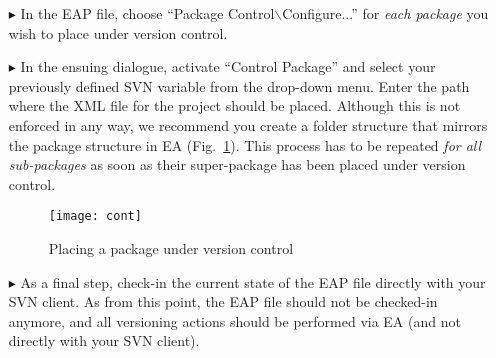 \begin{enumerate}
\item[$\blacktriangleright$] In the EAP file, choose ``Package Control$\backslash$Configure...'' for \emph{each package} you wish to place under version control.

\newpage

\item[$\blacktriangleright$] In the ensuing dialogue, activate ``Control Package'' and select your previously defined SVN variable from the drop-down menu.
Enter the path where the XML file for the project should be placed. Although this is not enforced in any way, we recommend you create a folder structure that
mirrors the package structure in EA (Fig.~\ref{fig:advanced-topics-eaSVN-addPackage}). This process has to be repeated \emph{for all sub-packages} as soon as
their super-package has been placed under version control.

\vspace{0.5cm}

\begin{figure}[!htbp]
\begin{center}
	\texttt{[image: cont]}
	\caption{Placing a package under version control}
  	\label{fig:advanced-topics-eaSVN-addPackage}
\end{center}
\end{figure}

\item[$\blacktriangleright$] As a final step, check-in the current state of the EAP file directly with your SVN client.
As from this point, the EAP file should not be checked-in anymore, and all versioning actions should be performed via EA (and not directly with your SVN
client).

\end{enumerate}
